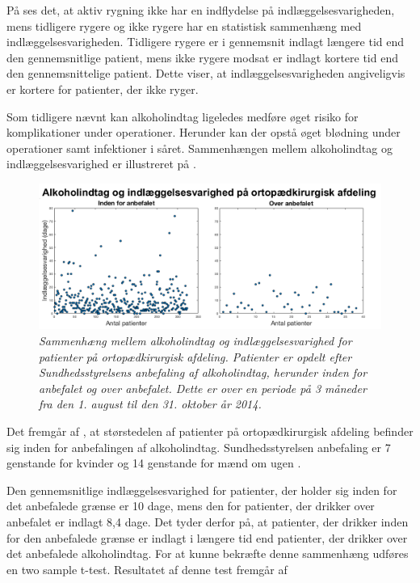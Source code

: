\noindent
På  ses det, at aktiv rygning ikke har en indflydelse på indlæggelsesvarigheden, mens tidligere rygere og ikke rygere har en statistisk sammenhæng med indlæggelsesvarigheden. Tidligere rygere er i gennemsnit indlagt længere tid end den gennemsnitlige patient, mens ikke rygere modsat er indlagt kortere tid end den gennemsnittelige patient. Dette viser, at indlæggelsesvarigheden angiveligvis er kortere for patienter, der ikke ryger. 


Som tidligere nævnt kan alkoholindtag ligeledes medføre øget risiko for komplikationer under operationer. Herunder kan der opstå øget blødning under operationer samt infektioner i såret.\cite{Nordjylland2014} Sammenhængen mellem alkoholindtag og indlæggelsesvarighed er illustreret på  . 


\begin{figure}[H]
	\centering
	\includegraphics[scale=0.4]{figures/alkohologindlaeg}
	\caption{\textit{Sammenhæng mellem alkoholindtag og indlæggelsesvarighed for patienter på ortopædkirurgisk afdeling. Patienter er opdelt efter Sundhedsstyrelsens anbefaling af alkoholindtag, herunder inden for anbefalet og over anbefalet. Dette er over en periode på 3 måneder fra den 1. august til den 31. oktober år 2014.}}
	\label{alkohologindlaeggelse}
\end{figure}

\noindent
Det fremgår af , at størstedelen af patienter på ortopædkirurgisk afdeling befinder sig inden for anbefalingen af alkoholindtag. Sundhedsstyrelsen anbefaling er 7 genstande for kvinder og 14 genstande for mænd om ugen \cite{Sundhedsstyrelsen2016}.


Den gennemsnitlige indlæggelsesvarighed for patienter, der holder sig inden for det anbefalede grænse er 10 dage, mens den for patienter, der drikker over anbefalet er indlagt 8,4 dage. Det tyder derfor på, at patienter, der drikker inden for den anbefalede grænse er indlagt i længere tid end patienter, der drikker over det anbefalede alkoholindtag.
For at kunne bekræfte denne sammenhæng udføres en two sample t-test. Resultatet af denne test fremgår af 


